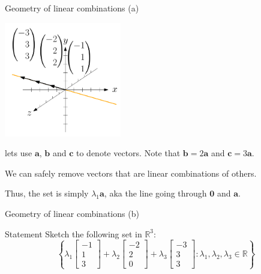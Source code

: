 \documentclass[10pt]{beamer}
\begin{document}
\begin{frame}{Geometry of linear combinations (a)}

    \begin{center}
        \includegraphics[height=5cm]{../img/png/3.a}
    \end{center}

    lets use $\mathbf a$, $\mathbf b$ and $\mathbf c$ to denote vectors. Note that $\mathbf b = 2 \mathbf a$ and $\mathbf c = 3 \mathbf a$.

    We can safely remove vectors that are linear combinations of others.

    Thus, the set is simply $\lambda_1 \mathbf a$, aka the line going through $\mathbf 0$ and $\mathbf a$.
\end{frame}

\begin{frame}{Geometry of linear combinations (b)}
    \begin{block}{Statement}
        Sketch the following set in $\mathbb R^3$:
        $$\left\{\lambda_1 \begin{bmatrix}-1 \\ 1 \\ 3\end{bmatrix} + \lambda_2 \begin{bmatrix}-2 \\ 2 \\ 0\end{bmatrix} + \lambda_3 \begin{bmatrix}-3 \\ 3 \\ 3\end{bmatrix} : \lambda_1, \lambda_2, \lambda_3 \in \mathbb R\right\}$$
    \end{block}
\end{frame}
\end{document}
